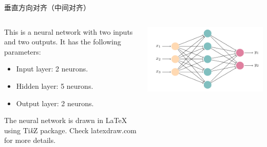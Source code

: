 \documentclass{ctexbeamer}
\begin{document}
\begin{frame}{垂直方向对齐（中间对齐）}
  \begin{columns}[c]
  \begin{column}{0.5\textwidth}
    This is a neural network with two inputs and two outputs. It has the following parameters:
    \begin{itemize}
      \item Input layer: 2 neurons.
      \item Hidden layer: 5 neurons.
      \item Output layer: 2 neurons.
    \end{itemize}
    The neural network is drawn in \LaTeX{} using Ti\textit{k}Z package. Check latexdraw.com for more details.
  \end{column}
  \begin{column}{0.5\textwidth}
    \includegraphics[width=\textwidth]{neural-networks.pdf}
  \end{column}
  \end{columns}
\end{frame}
\end{document}
